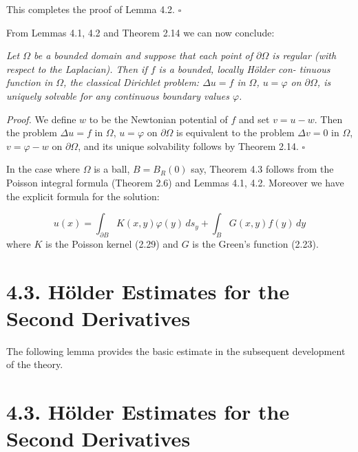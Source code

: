 This completes the proof of Lemma 4.2. $\square$

From Lemmas 4.1, 4.2 and Theorem 2.14 we can now conclude:

\begin{theorem}\label{gt:thm-dirichlet-poisson}
\textit{Let $\Omega$ be a bounded domain and suppose that each point of $\partial\Omega$ is
regular (with respect to the Laplacian). Then if $f$ is a bounded, locally H\"older con-
tinuous function in $\Omega$, the classical Dirichlet problem: $\Delta u=f$ in $\Omega$, $u=\varphi$ on $\partial\Omega$, is
uniquely solvable for any continuous boundary values $\varphi$.}

\textit{Proof.} We define $w$ to be the Newtonian potential of $f$ and set $v=u-w$. Then
the problem $\Delta u=f$ in $\Omega$, $u=\varphi$ on $\partial\Omega$ is equivalent to the problem $\Delta v=0$ in $\Omega$,
$v=\varphi-w$ on $\partial\Omega$, and its unique solvability follows by Theorem 2.14. $\square$

In the case where $\Omega$ is a ball, $B=B_R(0)$ say, Theorem 4.3 follows from the
Poisson integral formula (Theorem 2.6) and Lemmas 4.1, 4.2. Moreover we have
the explicit formula for the solution:

\begin{equation}
\tag{4.10}
u(x)=\int_{\partial B} K(x,y)\varphi(y)\,ds_y+\int_B G(x,y)f(y)\,dy
\end{equation}
where $K$ is the Poisson kernel (2.29) and $G$ is the Green's function (2.23).
\end{theorem}

\section*{4.3. H\"older Estimates for the Second Derivatives}

The following lemma provides the basic estimate in the subsequent development of
the theory.





\section*{4.3. H\"older Estimates for the Second Derivatives}

